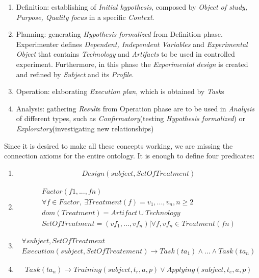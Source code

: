 	\begin{enumerate}
		\item Definition: establishing of \textit{Initial hypothesis}, composed by \textit{Object of study, Purpose, Quality focus} in a specific \textit{Context}.
		\item Planning: generating \textit{Hypothesis formalized} from Definition phase. Experimenter defines \textit{Dependent, Independent Variables} and \textit{Experimental Object} that contains \textit{Technology} and \textit{Artifacts} to be used in controlled experiment. Furthermore, in this phase the \textit{Experimental design} is created and refined by \textit{Subject} and its \textit{Profile}.
		\item Operation: elaborating \textit{Execution plan}, which is obtained by \textit{Task}s 
		\item Analysis: gathering \textit{Result}s from Operation phase are to be used in \textit{Analysis} of different types, such as \textit{Confirmatory}(testing \textit{Hypothesis formalized}) or \textit{Exploratory}(investigating new relationships)   
	\end{enumerate}
	Since it is desired to make all these concepts working, we are missing the connection axioms for the entire ontology. It is enough to define four predicates:
	\begin{enumerate}
		\item
		\begin{align*}
		 Design(subject, SetOfTreatment)
		\end{align*} 
		\item 
		\begin{align*}
			Factor(f1,...,fn) \\
			 \forall f \in Factor,\ \exists Treatment(f) = {v_1,...,v_n}, n \ge 2 \\
			dom(Treatment) = Artifact \cup Technology \\
			SetOfTreatment = (vf_1,...,vf_n)|\forall f, vf_n \in Treatment(fn)
		\end{align*}
		\item 
		\begin{align*}
			\forall subject, SetOfTreatment \\
			Execution(subject, SetOfTreatement) \rightarrow Task(ta_1) \land...\land Task(ta_n)
		\end{align*}
		\item 
		\begin{align*}
			Task(ta_n) \rightarrow Training(subject,t_r,a,p) \lor Applying(subject,t_e,a,p)
		\end{align*}
		
	\end{enumerate}
